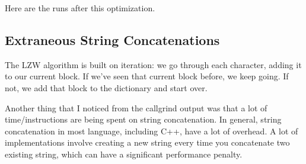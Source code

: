 \documentclass[12pt,twoside]{reedthesis}
\begin{document}
Here are the runs after this optimization.

\hypertarget{extraneous-string-concatenations}{%
\subsection{Extraneous String Concatenations}\label{extraneous-string-concatenations}}

The LZW algorithm is built on iteration: we go through each character, adding it to our current block. If we've seen that current block before, we keep going. If not, we add that block to the dictionary and start over.

Another thing that I noticed from the callgrind output was that a lot of time/instructions are being spent on string concatenation. In general, string concatenation in most language, including C++, have a lot of overhead. A lot of implementations involve creating a new string every time you concatenate two existing string, which can have a significant performance penalty.
\end{document}
